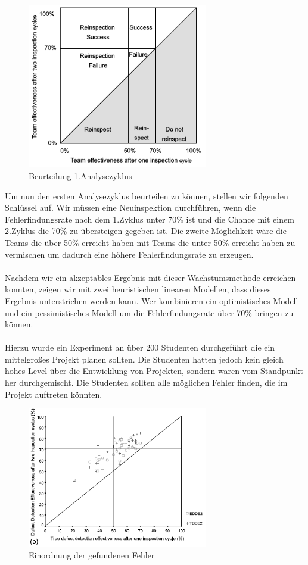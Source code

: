 \documentclass{llncs}
\begin{document}
\begin{figure}
	\centering
	\includegraphics[width=0.7\textwidth]{images/3_2_2.png}
	\caption{Beurteilung 1.Analysezyklus}
	\label{fig:3_2_2_png}
\end{figure}

Um nun den ersten Analysezyklus beurteilen zu können, stellen wir folgenden Schlüssel auf. Wir müssen eine Neuinspektion durchführen, wenn die Fehlerfindungsrate nach dem 1.Zyklus unter 70\% ist und die Chance mit einem 2.Zyklus die 70\% zu übersteigen gegeben ist. Die zweite Möglichkeit wäre die Teams die über 50\% erreicht haben mit Teams die unter 50\% erreicht haben zu vermischen um dadurch eine höhere Fehlerfindungsrate zu erzeugen.
\\ \\
Nachdem wir ein akzeptables Ergebnis mit dieser Wachstumsmethode erreichen konnten, zeigen wir mit zwei heuristischen linearen Modellen, dass dieses Ergebnis unterstrichen werden kann. Wer kombinieren ein optimistisches Modell und ein pessimistisches Modell um die Fehlerfindungsrate über 70\% bringen zu können. 
\\ \\
Hierzu wurde ein Experiment an über 200 Studenten durchgeführt die ein mittelgroßes Projekt planen sollten. Die Studenten hatten jedoch kein gleich hohes Level über die Entwicklung von Projekten, sondern waren vom Standpunkt her durchgemischt. Die Studenten sollten alle möglichen Fehler finden, die im Projekt auftreten könnten.

\begin{figure}
	\centering
	\includegraphics[width=0.7\textwidth]{images/3_2_3.png}
	\caption{Einordnung der gefundenen Fehler}
	\label{fig:3_2_3_png}
\end{figure}
\end{document}
